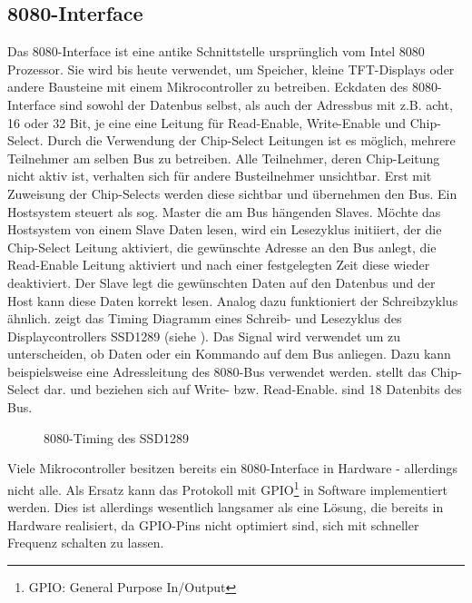 \subsection{8080-Interface}
Das 8080-Interface ist eine antike Schnittstelle ursprünglich vom Intel 8080 Prozessor. Sie wird bis heute verwendet, um Speicher, kleine TFT-Displays oder andere Bausteine mit einem Mikrocontroller zu betreiben. Eckdaten des 8080-Interface sind sowohl der Datenbus selbst, als auch der Adressbus mit z.B. acht, 16 oder 32 Bit, je eine eine Leitung für Read-Enable, Write-Enable und Chip-Select. Durch die Verwendung der Chip-Select Leitungen ist es möglich, mehrere Teilnehmer am selben Bus zu betreiben. Alle Teilnehmer, deren Chip-Leitung nicht aktiv ist, verhalten sich für andere Busteilnehmer unsichtbar. Erst mit Zuweisung der Chip-Selects werden diese sichtbar und übernehmen den Bus. Ein Hostsystem steuert als sog. Master die am Bus hängenden Slaves. Möchte das Hostsystem von einem Slave Daten lesen, wird ein Lesezyklus initiiert, der die Chip-Select Leitung aktiviert, die gewünschte Adresse an den Bus anlegt, die Read-Enable Leitung aktiviert und nach einer festgelegten Zeit diese wieder deaktiviert. Der Slave legt die gewünschten Daten auf den Datenbus und der Host kann diese Daten korrekt lesen. Analog dazu funktioniert der Schreibzyklus ähnlich. 
 zeigt das Timing Diagramm eines Schreib- und Lesezyklus des Displaycontrollers SSD1289 (siehe \cite{SSD2007}). Das Signal  wird verwendet um zu unterscheiden, ob Daten oder ein Kommando auf dem Bus anliegen. Dazu kann beispielsweise eine Adressleitung des 8080-Bus verwendet werden.  stellt das Chip-Select dar.  und  beziehen sich auf Write- bzw. Read-Enable.  sind 18 Datenbits des Bus. 

\begin{figure}[htp]
	\centering
{}
	\caption{8080-Timing des SSD1289}
	\label{fig:8080_timing}
\end{figure}
Viele Mikrocontroller besitzen bereits ein 8080-Interface in Hardware - allerdings nicht alle. Als Ersatz kann das Protokoll mit GPIO\footnote{GPIO: General Purpose In/Output} in Software implementiert werden. Dies ist allerdings wesentlich langsamer als eine Lösung, die bereits in Hardware realisiert, da GPIO-Pins nicht optimiert sind, sich mit schneller Frequenz schalten zu lassen.
\clearpage

